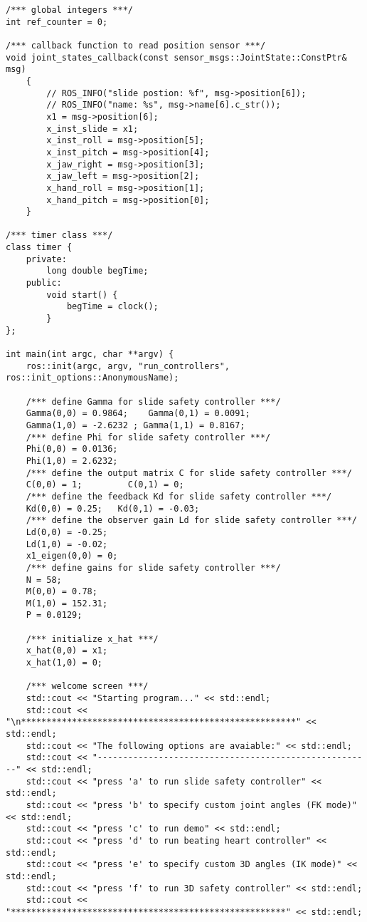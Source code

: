 \begin{lstlisting}[language=gedit]
/*** global integers ***/
int ref_counter = 0;

/*** callback function to read position sensor ***/
void joint_states_callback(const sensor_msgs::JointState::ConstPtr& msg)
    { 
        // ROS_INFO("slide postion: %f", msg->position[6]);
        // ROS_INFO("name: %s", msg->name[6].c_str());  
        x1 = msg->position[6];
        x_inst_slide = x1;
        x_inst_roll = msg->position[5];
        x_inst_pitch = msg->position[4];
        x_jaw_right = msg->position[3];
        x_jaw_left = msg->position[2];
        x_hand_roll = msg->position[1];
        x_hand_pitch = msg->position[0];
    }

/*** timer class ***/
class timer {
	private:
		long double begTime;
	public:
		void start() {
			begTime = clock();
		}
};

int main(int argc, char **argv) {
    ros::init(argc, argv, "run_controllers", ros::init_options::AnonymousName);

    /*** define Gamma for slide safety controller ***/
    Gamma(0,0) = 0.9864;    Gamma(0,1) = 0.0091;
    Gamma(1,0) = -2.6232 ; Gamma(1,1) = 0.8167;
    /*** define Phi for slide safety controller ***/
    Phi(0,0) = 0.0136;      
    Phi(1,0) = 2.6232;
    /*** define the output matrix C for slide safety controller ***/
    C(0,0) = 1;         C(0,1) = 0;
    /*** define the feedback Kd for slide safety controller ***/
    Kd(0,0) = 0.25;   Kd(0,1) = -0.03;
    /*** define the observer gain Ld for slide safety controller ***/
    Ld(0,0) = -0.25;
    Ld(1,0) = -0.02;
    x1_eigen(0,0) = 0;
    /*** define gains for slide safety controller ***/
    N = 58;
    M(0,0) = 0.78;
    M(1,0) = 152.31;
    P = 0.0129;

    /*** initialize x_hat ***/
    x_hat(0,0) = x1;
    x_hat(1,0) = 0;

    /*** welcome screen ***/
    std::cout << "Starting program..." << std::endl;
    std::cout << "\n******************************************************" << std::endl;
    std::cout << "The following options are avaiable:" << std::endl;
    std::cout << "------------------------------------------------------" << std::endl;
    std::cout << "press 'a' to run slide safety controller" << std::endl;
    std::cout << "press 'b' to specify custom joint angles (FK mode)" << std::endl;
    std::cout << "press 'c' to run demo" << std::endl;
    std::cout << "press 'd' to run beating heart controller" << std::endl;
    std::cout << "press 'e' to specify custom 3D angles (IK mode)" << std::endl;
    std::cout << "press 'f' to run 3D safety controller" << std::endl;
    std::cout << "******************************************************" << std::endl;


\end{lstlisting}

